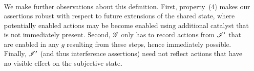 \begin{definition}
\[\begin{array}{L}
\end{array}
\]
\end{definition}

We make further observations about this definition. First,
property~(4) makes our assertions robust with respect to future
extensions of the shared state, where potentially enabled actions may
be become enabled using additional catalyst that is not immediately
present. Second, $\mathscr{G}$ only has to record actions from $\mathscr{I}'$ that
are enabled in any $g$ resulting from these steps, hence immediately
possible. Finally, $\mathscr{I}'$ (and thus interference assertions) need
not reflect actions that have no visible effect on the subjective
state.

